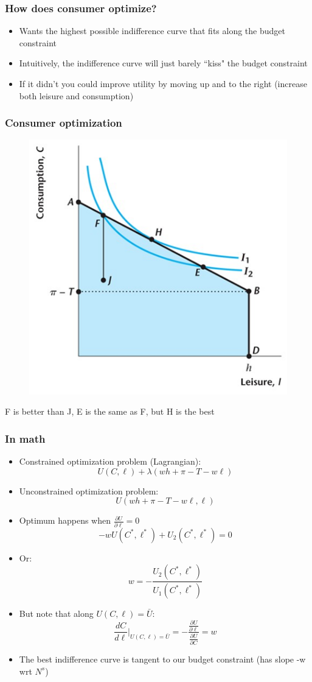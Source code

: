 \documentclass{beamer}
\begin{document}
\begin{frame}
\frametitle[alignment=center]{How does consumer optimize?}
\begin{itemize}
\item Wants the highest possible indifference curve that fits along the budget constraint
\bigskip
\item Intuitively, the indifference curve will just barely ``kiss" the budget constraint
\bigskip
\item If it didn't you could improve utility by moving up and to the right (increase both leisure and consumption)
\end{itemize}
\end{frame}

\begin{frame}
\frametitle[alignment=center]{Consumer optimization}
\begin{figure}
\centering
\includegraphics[scale=0.5]{Figures/W_Fig_4pt5.png}
\end{figure}
F is better than J, E is the same as F, but H is the best
\end{frame}

\begin{frame}
\frametitle[alignment=center]{In math}
\begin{itemize}
\item Constrained optimization problem (Lagrangian):
$$U(C,\ell)+\lambda(wh+\pi-T-w\ell)$$
\item Unconstrained optimization problem:
$$U(wh+\pi-T-w\ell,\ell)$$
\item Optimum happens when $\frac{\partial U}{\partial \ell}=0$
$$-wU(C^*,\ell^*)+U_2(C^*,\ell^*)=0$$
\item Or:
$$w=-\frac{U_2(C^*,\ell^*)}{U_1(C^*,\ell^*)}$$
\item But note that along $U(C,\ell)=\bar{U}$:
$$\frac{d C}{d \ell}|_{U(C,\ell)=\bar{U}}=-\frac{\frac{\partial U}{\partial \ell} }{\frac{\partial U}{\partial C}}=w$$
\item The best indifference curve is tangent to our budget constraint (has slope -w wrt $N^s$)
\end{itemize}
\end{frame}
\end{document}
